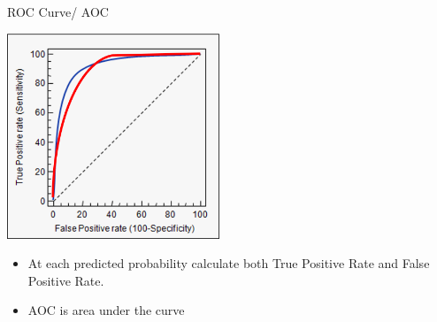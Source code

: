\documentclass[aspectratio=169]{beamer}
\begin{document}
\begin{frame}{ROC Curve/ AOC}
\begin{center}
\includegraphics[width=2.5in]{resources/roc_curve.png}\\
\end{center}
\begin{itemize}
\item At each predicted probability calculate both \alert{True Positive Rate} and \alert{False Positive Rate}.
\item AOC is area under the curve
\end{itemize}
\end{frame}


\end{document}
